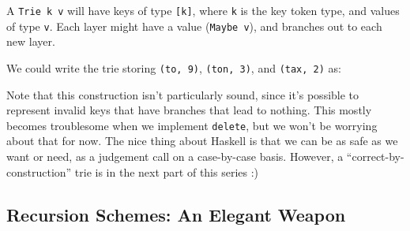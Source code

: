 \documentclass[]{article}
\newenvironment{Shaded}{}{}
\newcommand{\CharTok}[1]{\textcolor[rgb]{0.25,0.44,0.63}{#1}}
\newcommand{\CommentTok}[1]{\textcolor[rgb]{0.38,0.63,0.69}{\textit{#1}}}
\newcommand{\DataTypeTok}[1]{\textcolor[rgb]{0.56,0.13,0.00}{#1}}
\newcommand{\DecValTok}[1]{\textcolor[rgb]{0.25,0.63,0.44}{#1}}
\newcommand{\FunctionTok}[1]{\textcolor[rgb]{0.02,0.16,0.49}{#1}}
\newcommand{\NormalTok}[1]{#1}
\newcommand{\OtherTok}[1]{\textcolor[rgb]{0.00,0.44,0.13}{#1}}
\begin{document}
A \texttt{Trie\ k\ v} will have keys of type \texttt{{[}k{]}}, where \texttt{k}
is the key token type, and values of type \texttt{v}. Each layer might have a
value (\texttt{Maybe\ v}), and branches out to each new layer.

We could write the trie storing \texttt{(to,\ 9)}, \texttt{(ton,\ 3)}, and
\texttt{(tax,\ 2)} as:

\begin{Shaded}
\end{Shaded}

Note that this construction isn't particularly sound, since it's possible to
represent invalid keys that have branches that lead to nothing. This mostly
becomes troublesome when we implement \texttt{delete}, but we won't be worrying
about that for now. The nice thing about Haskell is that we can be as safe as we
want or need, as a judgement call on a case-by-case basis. However, a
``correct-by-construction'' trie is in the next part of this series :)

\hypertarget{recursion-schemes-an-elegant-weapon}{%
\subsection{Recursion Schemes: An Elegant
Weapon}\label{recursion-schemes-an-elegant-weapon}}
\end{document}
